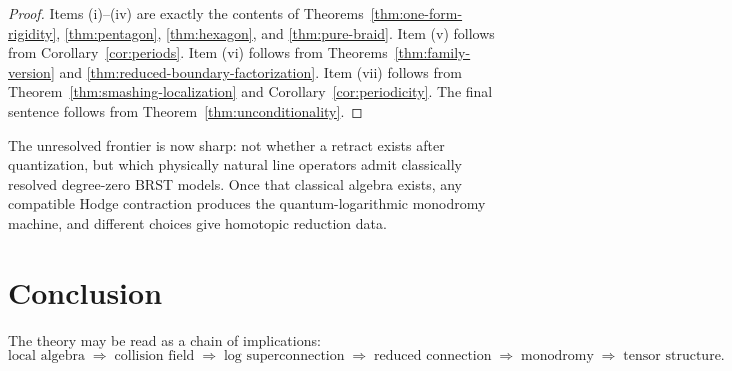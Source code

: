 \begin{proof}
Items (i)--(iv) are exactly the contents of Theorems~\ref{thm:one-form-rigidity}, \ref{thm:pentagon}, \ref{thm:hexagon}, and \ref{thm:pure-braid}. Item (v) follows from Corollary~\ref{cor:periods}. Item (vi) follows from Theorems~\ref{thm:family-version} and \ref{thm:reduced-boundary-factorization}. Item (vii) follows from Theorem~\ref{thm:smashing-localization} and Corollary~\ref{cor:periodicity}. The final sentence follows from Theorem~\ref{thm:unconditionality}.
\end{proof}

\begin{remark}
The unresolved frontier is now sharp: not whether a retract exists after quantization, but which physically natural line operators admit classically resolved degree-zero BRST models. Once that classical algebra exists, any compatible Hodge contraction produces the quantum-logarithmic monodromy machine, and different choices give homotopic reduction data.
\end{remark}

\section{Conclusion}%

The theory may be read as a chain of implications:
\begin{equation}%
\text{local algebra}
\;\Longrightarrow\;
\text{collision field}
\;\Longrightarrow\;
\text{log superconnection}
\;\Longrightarrow\;
\text{reduced connection}
\;\Longrightarrow\;
\text{monodromy}
\;\Longrightarrow\;
\text{tensor structure}.
\end{equation}

